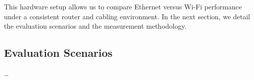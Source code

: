 







        This hardware setup allows us to compare Ethernet versus Wi-Fi performance 
        under a consistent router and cabling environment. 
        In the next section, we detail the evaluation scenarios and 
        the measurement methodology.


    \subsection{Evaluation Scenarios} \label{subsec:evaluation-scenarios}

        \ldots
